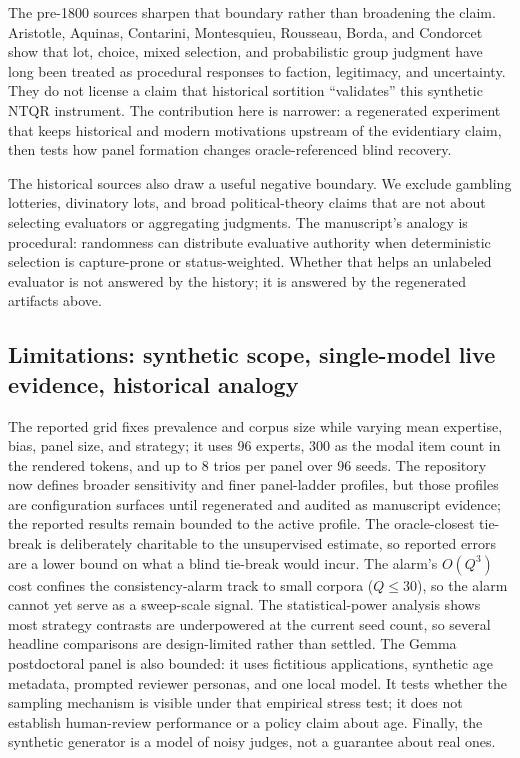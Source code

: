 \documentclass[
]{article}
\begin{document}
The pre-1800 sources sharpen that boundary rather than broadening the
claim. Aristotle, Aquinas, Contarini, Montesquieu, Rousseau, Borda, and
Condorcet show that lot, choice, mixed selection, and probabilistic
group judgment have long been treated as procedural responses to
faction, legitimacy, and uncertainty. They do not license a claim that
historical sortition ``validates'' this synthetic NTQR instrument. The
contribution here is narrower: a regenerated experiment that keeps
historical and modern motivations upstream of the evidentiary claim,
then tests how panel formation changes oracle-referenced blind recovery.

The historical sources also draw a useful negative boundary. We exclude
gambling lotteries, divinatory lots, and broad political-theory claims
that are not about selecting evaluators or aggregating judgments. The
manuscript's analogy is procedural: randomness can distribute evaluative
authority when deterministic selection is capture-prone or
status-weighted. Whether that helps an unlabeled evaluator is not
answered by the history; it is answered by the regenerated artifacts
above.

\subsection{Limitations: synthetic scope, single-model live evidence,
historical
analogy}\label{limitations-synthetic-scope-single-model-live-evidence-historical-analogy}

The reported  grid fixes prevalence and
corpus size while varying mean expertise, bias, panel size, and
strategy; it uses 96 experts, 300 as the modal item count in the
rendered tokens, and up to 8 trios per panel over 96 seeds. The
repository now defines broader sensitivity and finer panel-ladder
profiles, but those profiles are configuration surfaces until
regenerated and audited as manuscript evidence; the reported results
remain bounded to the active profile. The oracle-closest tie-break is
deliberately charitable to the unsupervised estimate, so reported errors
are a lower bound on what a blind tie-break would incur. The alarm's
\(O(Q^3)\) cost confines the consistency-alarm track to small corpora
(\(Q\leq30\)), so the alarm cannot yet serve as a sweep-scale signal.
The statistical-power analysis shows most strategy contrasts are
underpowered at the current seed count, so several headline comparisons
are design-limited rather than settled. The Gemma postdoctoral panel is
also bounded: it uses fictitious applications, synthetic age metadata,
prompted reviewer personas, and one local model. It tests whether the
sampling mechanism is visible under that empirical stress test; it does
not establish human-review performance or a policy claim about age.
Finally, the synthetic generator is a model of noisy judges, not a
guarantee about real ones.
\end{document}
